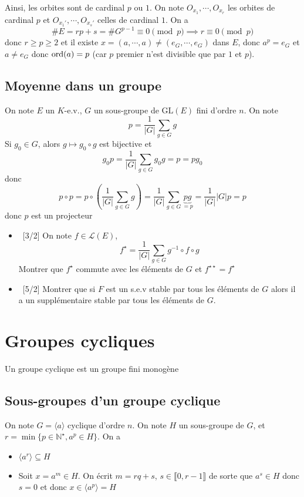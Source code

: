 Ainsi, les orbites sont de cardinal $p$ ou $1$. On note $O_{x_1}, \cdots, O_{x_r}$ les orbites de cardinal $p$ et $O_{x_1'}, \cdots, O_{x_s'}$ celles de cardinal $1$. On a \[
    \#E=rp+s=\#G^{p-1}\equiv 0\pmod p \implies r\equiv 0\pmod p
\]
donc $r\geq p\geq 2$ et il existe $x=(a, \cdots, a)\neq (e_G, \cdots, e_G)$ dans $E$, donc $a^p=e_G$ et $a\neq e_G$ donc $\mathrm{ord} (a)=p$ (car $p$ premier n'est divisible que par $1$ et $p$).

\subsection{Moyenne dans un groupe}

On note $E$ un $K$-e.v., $G$ un sous-groupe de $\mathrm{GL}(E)$ fini d'ordre $n$. On note \[
    p= \frac{1}{|G|} \sum_{g\in G} g
\]
Si $g_0\in G$, alors $g\longmapsto g_0\circ g$ est bijective et \[
    g_0 p=\frac1{|G|}\sum_{g\in G}g_0 g=p=pg_0
\]
donc \[
    p\circ p=p\circ \left( \frac1{|G|}\sum_{g\in G} g\right)=\frac1{|G|}\sum_{g\in G}\underbrace{pg}_{=p}=\frac1{|G|}|G|p=p
\]
donc $p$ est un projecteur


\begin{exo}
    \begin{itemize}
        \item ~[3/2] On note $f\in \mathcal L(E)$, \[
                f^\star = \frac1{|G|}\sum_{g\in G}g^{-1}\circ f\circ g
            \]
            Montrer que $f^\star$ commute avec les éléments de $G$ et $f^{\star\star}=f^\star$
        \item ~[5/2] Montrer que si $F$ est un s.e.v stable par tous les éléments de $G$ alors il a un supplémentaire stable par tous les éléments de $G$.
    \end{itemize}
\end{exo}

\section{Groupes cycliques}

\begin{dfn}
    Un groupe cyclique est un groupe fini monogène
\end{dfn}

\subsection{Sous-groupes d'un groupe cyclique}

On note $G=\langle a\rangle$ cyclique d'ordre $n$. On note $H$ un sous-groupe de $G$, et $r=\min\{p\in\mathbb N^\star, a^p\in H\}$. On a \begin{itemize}
    \item $\langle a^r\rangle\subseteq H$
    \item Soit $x=a^m\in H$. On écrit $m=rq+s$, $s\in\llbracket 0, r-1\rrbracket$ de sorte que $a^s\in H$ donc $s=0$ et donc $x\in \langle a^p\rangle=H$
\end{itemize}

